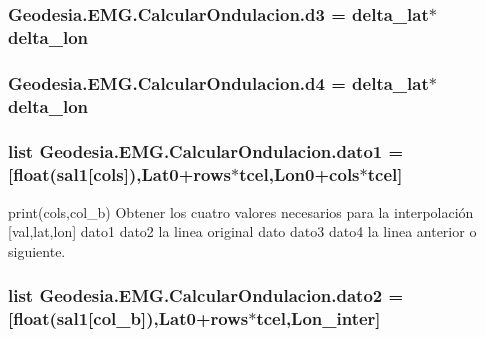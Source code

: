 \subsubsection[{d3}]{\setlength{\rightskip}{0pt plus 5cm}Geodesia.\-E\-M\-G.\-Calcular\-Ondulacion.\-d3 = {\bf delta\-\_\-lat}$\ast${\bf delta\-\_\-lon}}\label{namespaceGeodesia_1_1EMG_1_1CalcularOndulacion_aea8932a198b08b5ade299681c20dafd9}
\subsubsection[{d4}]{\setlength{\rightskip}{0pt plus 5cm}Geodesia.\-E\-M\-G.\-Calcular\-Ondulacion.\-d4 = {\bf delta\-\_\-lat}$\ast${\bf delta\-\_\-lon}}\label{namespaceGeodesia_1_1EMG_1_1CalcularOndulacion_addd77f9e8dbe68c153808b1765f68afe}
\subsubsection[{dato1}]{\setlength{\rightskip}{0pt plus 5cm}list Geodesia.\-E\-M\-G.\-Calcular\-Ondulacion.\-dato1 = [float({\bf sal1}[{\bf cols}]),{\bf Lat0}+{\bf rows}$\ast${\bf tcel},{\bf Lon0}+{\bf cols}$\ast${\bf tcel}]}\label{namespaceGeodesia_1_1EMG_1_1CalcularOndulacion_aafb1d55da92f4cc3de9a4742c6cb696e}


print(cols,col\-\_\-b) Obtener los cuatro valores necesarios para la interpolación [val,lat,lon] dato1 dato2  la linea original dato dato3 dato4  la linea anterior o siguiente. 

\subsubsection[{dato2}]{\setlength{\rightskip}{0pt plus 5cm}list Geodesia.\-E\-M\-G.\-Calcular\-Ondulacion.\-dato2 = [float({\bf sal1}[{\bf col\-\_\-b}]),{\bf Lat0}+{\bf rows}$\ast${\bf tcel},{\bf Lon\-\_\-inter}]}\label{namespaceGeodesia_1_1EMG_1_1CalcularOndulacion_a895f04b2965687097262110ab6a6c68b}
